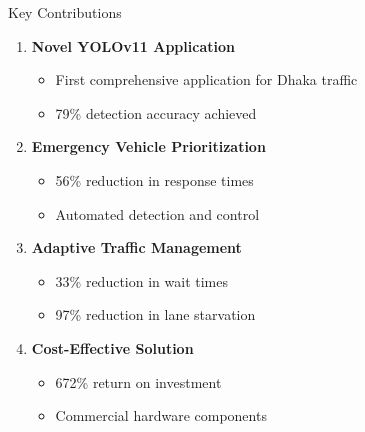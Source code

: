 \documentclass[10pt]{beamer}
\begin{document}
\begin{frame}{Key Contributions}
    \begin{enumerate}
        \item \textbf{Novel YOLOv11 Application}
        \begin{itemize}
            \item First comprehensive application for Dhaka traffic
            \item 79\% detection accuracy achieved
        \end{itemize}
        
        \item \textbf{Emergency Vehicle Prioritization}
        \begin{itemize}
            \item 56\% reduction in response times
            \item Automated detection and control
        \end{itemize}
        
        \item \textbf{Adaptive Traffic Management}
        \begin{itemize}
            \item 33\% reduction in wait times
            \item 97\% reduction in lane starvation
        \end{itemize}
        
        \item \textbf{Cost-Effective Solution}
        \begin{itemize}
            \item 672\% return on investment
            \item Commercial hardware components
        \end{itemize}
    \end{enumerate}
\end{frame}
\end{document}
